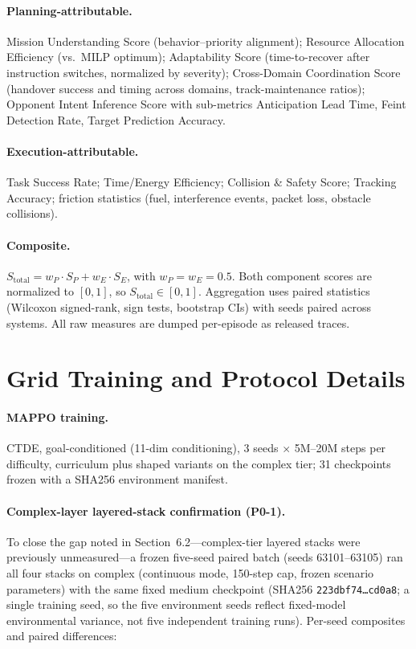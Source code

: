 \documentclass[sigconf,anonymous]{aamas}
\begin{document}
\paragraph{Planning-attributable.}
Mission Understanding Score (behavior--priority alignment); Resource Allocation Efficiency (vs.\ MILP optimum); Adaptability Score (time-to-recover after instruction switches, normalized by severity); Cross-Domain Coordination Score (handover success and timing across domains, track-maintenance ratios); Opponent Intent Inference Score with sub-metrics Anticipation Lead Time, Feint Detection Rate, Target Prediction Accuracy.

\paragraph{Execution-attributable.}
Task Success Rate; Time/Energy Efficiency; Collision \& Safety Score; Tracking Accuracy; friction statistics (fuel, interference events, packet loss, obstacle collisions).

\paragraph{Composite.}
$S_{\mathrm{total}} = w_P \cdot S_P + w_E \cdot S_E$, with $w_P = w_E = 0.5$. Both component scores are normalized to $[0,1]$, so $S_{\mathrm{total}} \in [0,1]$. Aggregation uses paired statistics (Wilcoxon signed-rank, sign tests, bootstrap CIs) with seeds paired across systems. All raw measures are dumped per-episode as released traces.

\section{Grid Training and Protocol Details}\label{app:F}

\paragraph{MAPPO training.}
CTDE, goal-conditioned (11-dim conditioning), 3 seeds $\times$ 5M--20M steps per difficulty, curriculum plus shaped variants on the complex tier; 31 checkpoints frozen with a SHA256 environment manifest.

\paragraph{Complex-layer layered-stack confirmation (P0-1).}
To close the gap noted in Section~6.2---complex-tier layered stacks were previously unmeasured---a frozen five-seed paired batch (seeds 63101--63105) ran all four stacks on complex (continuous mode, 150-step cap, frozen scenario parameters) with the same fixed medium checkpoint (SHA256 \texttt{223dbf74\ldots cd0a8}; a single training seed, so the five environment seeds reflect fixed-model environmental variance, not five independent training runs). Per-seed composites and paired differences:
\end{document}
